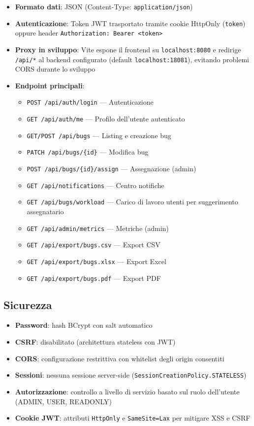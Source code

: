 ﻿\documentclass[a4paper,11pt]{article}
\begin{document}
\begin{itemize}
  \item \textbf{Formato dati}: JSON (Content-Type: \texttt{application/json})
  \item \textbf{Autenticazione}: Token JWT trasportato tramite cookie HttpOnly (\texttt{token}) oppure header \texttt{Authorization: Bearer <token>}
  \item \textbf{Proxy in sviluppo}: Vite espone il frontend su \texttt{localhost:8080} e redirige \texttt{/api/*} al backend configurato (default \texttt{localhost:18081}), evitando problemi CORS durante lo sviluppo
  \item \textbf{Endpoint principali}:
  \begin{itemize}
    \item \texttt{POST /api/auth/login} --- Autenticazione
    \item \texttt{GET /api/auth/me} --- Profilo dell'utente autenticato
    \item \texttt{GET/POST /api/bugs} --- Listing e creazione bug
    \item \texttt{PATCH /api/bugs/\{id\}} --- Modifica bug
    \item \texttt{POST /api/bugs/\{id\}/assign} --- Assegnazione (admin)
    \item \texttt{GET /api/notifications} --- Centro notifiche
    \item \texttt{GET /api/bugs/workload} --- Carico di lavoro utenti per suggerimento assegnatario
    \item \texttt{GET /api/admin/metrics} --- Metriche (admin)
    \item \texttt{GET /api/export/bugs.csv} --- Export CSV
    \item \texttt{GET /api/export/bugs.xlsx} --- Export Excel
    \item \texttt{GET /api/export/bugs.pdf} --- Export PDF
  \end{itemize}
\end{itemize}

\subsection{Sicurezza}

\begin{itemize}
  \item \textbf{Password}: hash BCrypt con salt automatico
  \item \textbf{CSRF}: disabilitato (architettura stateless con JWT)
  \item \textbf{CORS}: configurazione restrittiva con whitelist degli origin consentiti
  \item \textbf{Sessioni}: nessuna sessione server-side (\texttt{SessionCreationPolicy.STATELESS})
  \item \textbf{Autorizzazione}: controllo a livello di servizio basato sul ruolo dell'utente (ADMIN, USER, READONLY)
  \item \textbf{Cookie JWT}: attributi \texttt{HttpOnly} e \texttt{SameSite=Lax} per mitigare XSS e CSRF
\end{itemize}
\end{document}

